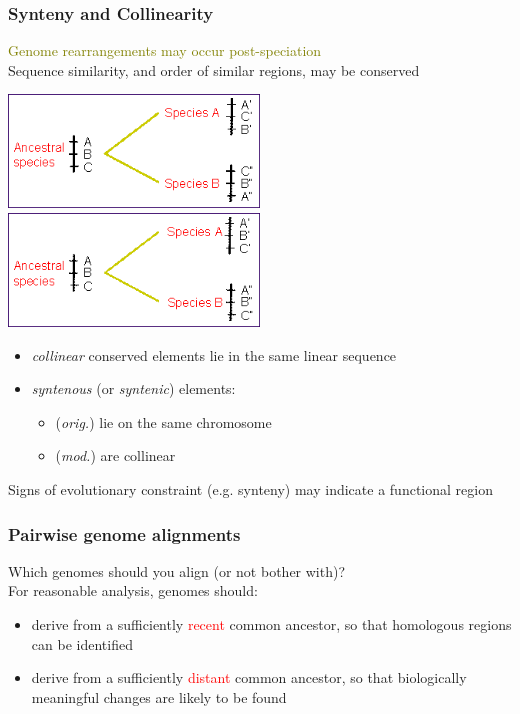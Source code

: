 %
\begin{frame}
  \frametitle{Synteny and Collinearity}
  \textcolor{olive}{Genome rearrangements may occur post-speciation} \\
  Sequence similarity, and order of similar regions, may be conserved
  \begin{center}
    \includegraphics[width=0.5\textwidth]{images/synteny}
    \includegraphics[width=0.5\textwidth]{images/collinear}    
  \end{center}    
  \begin{itemize}
    \item \textcolor{hutton_blue}{\textit{collinear}} conserved elements lie in the same linear sequence
    \item \textcolor{hutton_purple}{\textit{syntenous} (or \textit{syntenic})} elements:
    \begin{itemize}
      \item (\textit{orig.}) lie on the same chromosome
      \item (\textit{mod.}) are collinear
    \end{itemize}
  \end{itemize}
  Signs of evolutionary constraint (e.g. synteny) may indicate a functional region
\end{frame}

%
\begin{frame}
  \frametitle{Pairwise genome alignments}
  \textcolor{hutton_green}{Which genomes should you align (or not bother with)?} \\
  \textcolor{RawSienna}{For reasonable analysis, genomes should}:
  \begin{itemize}
    \item derive from a sufficiently \textcolor{red}{recent} common ancestor, so that \textcolor{hutton_purple}{homologous regions can be identified}
    \item derive from a sufficiently \textcolor{red}{distant} common ancestor, so that \textcolor{hutton_purple}{biologically meaningful changes are likely to be found}
  \end{itemize}
\end{frame}

